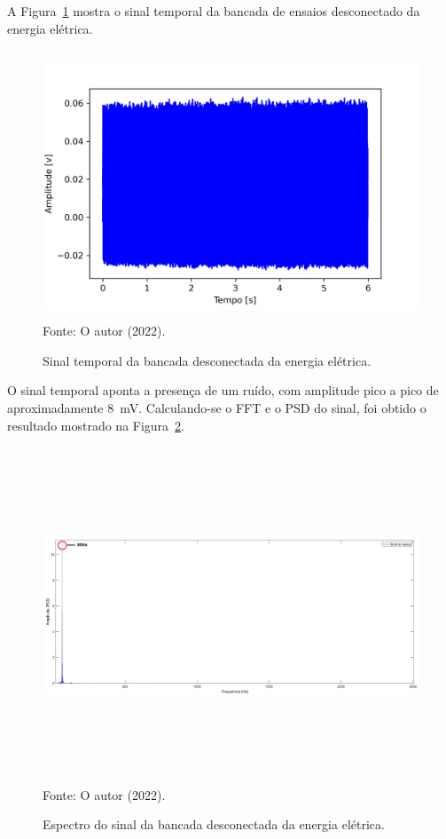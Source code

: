 \documentclass[
	12pt,				
	oneside,			
	a4paper,			
	english,			
	brazil,			
	]{abntex2ppgsi}
\begin{document}
A Figura~\ref{maquina_desligada_da_tomada} mostra o sinal temporal da bancada de ensaios desconectado da energia elétrica. 

\begin{figure}[H]
\centering
\caption {Sinal temporal da bancada desconectada da energia elétrica.}
\includegraphics[width=\textwidth,height=80mm,keepaspectratio]{Caso0/maquina_desligada_da_tomada} \\
Fonte: O autor (2022).
\label{maquina_desligada_da_tomada}
\end{figure} 

O sinal temporal aponta a presença de um ruído, com amplitude pico a pico de aproximadamente {\SI{8}{\milli\volt}}. Calculando-se o FFT e o PSD do sinal, foi obtido o resultado mostrado na Figura~\ref{PSD_SENSOR_MAQUINA_DESLIGADA}. 

\begin{figure}[H]
\centering
\caption {Espectro do sinal da bancada desconectada da energia elétrica.}
\includegraphics[width=\textwidth,height=100mm,keepaspectratio]{Caso0/PSD_SENSOR_MAQUINA_DESLIGADA} \\
Fonte: O autor (2022).
\label{PSD_SENSOR_MAQUINA_DESLIGADA}
\end{figure} 
\end{document}
